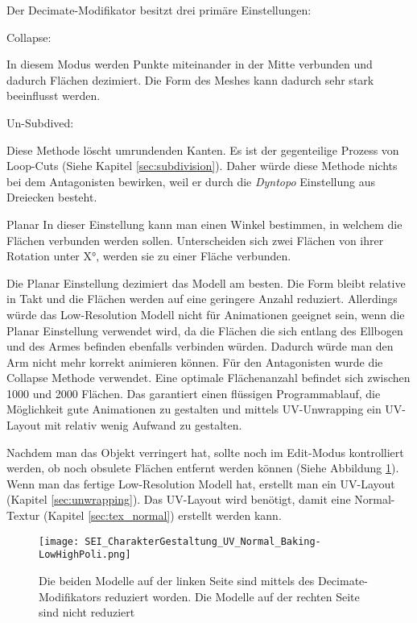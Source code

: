 Der Decimate-Modifikator besitzt drei primäre Einstellungen:

Collapse:

In diesem Modus werden Punkte miteinander in der Mitte verbunden und dadurch Flächen dezimiert. Die Form des Meshes
kann dadurch sehr stark beeinflusst werden.

Un-Subdived:

Diese Methode löscht umrundenden Kanten. Es ist der gegenteilige Prozess von Loop-Cuts (Siehe Kapitel \ref{sec:subdivision}).
Daher würde diese Methode nichts bei dem Antagonisten bewirken, weil er durch die \textit{Dyntopo} Einstellung aus
Dreiecken besteht.

Planar
In dieser Einstellung kann man einen Winkel bestimmen, in welchem die Flächen verbunden werden sollen.
Unterscheiden sich zwei Flächen von ihrer Rotation unter X°, werden sie zu einer Fläche verbunden.


Die Planar Einstellung dezimiert das Modell am besten. Die Form bleibt relative in Takt und die Flächen werden auf eine
geringere Anzahl reduziert. Allerdings würde das Low-Resolution Modell nicht für Animationen geeignet sein, wenn die
Planar Einstellung verwendet wird, da die Flächen die sich entlang des Ellbogen und des Armes befinden ebenfalls
verbinden würden. Dadurch würde man den Arm nicht mehr korrekt animieren können. Für den Antagonisten wurde die
Collapse Methode verwendet. Eine optimale Flächenanzahl befindet sich zwischen 1000 und 2000 Flächen. Das garantiert
einen flüssigen Programmablauf, die Möglichkeit gute Animationen zu gestalten und mittels UV-Unwrapping ein UV-Layout
mit relativ wenig Aufwand zu gestalten.

Nachdem man das Objekt verringert hat, sollte noch im Edit-Modus kontrolliert werden, ob noch obsulete Flächen entfernt
werden können (Siehe Abbildung \ref{picture:antagonist_decimated}). Wenn man das fertige Low-Resolution Modell hat,
erstellt man ein UV-Layout (Kapitel \ref{sec:unwrapping}).
Das UV-Layout wird benötigt, damit eine Normal-Textur (Kapitel \ref{sec:tex_normal}) erstellt werden kann.

\begin{figure}[H]
    \centering
    \texttt{[image: SEI\_CharakterGestaltung\_UV\_Normal\_Baking-LowHighPoli.png]}
    \caption{Die beiden Modelle auf der linken Seite sind mittels des Decimate-Modifikators reduziert worden. Die Modelle auf der rechten Seite sind nicht reduziert}
    \label{picture:antagonist_decimated}
\end{figure}



